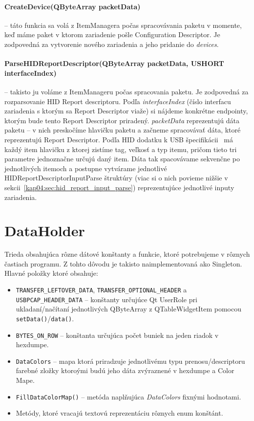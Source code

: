 \paragraph{CreateDevice(QByteArray packetData)} -- táto funkcia sa volá z ItemManagera počas spracovávania paketu v momente, keď máme paket v ktorom zariadenie pošle Configuration Descriptor. Je zodpovedná za vytvorenie nového zariadenia a jeho pridanie do \textit{devices}.

\paragraph{ParseHIDReportDescriptor(QByteArray packetData, USHORT interfaceIndex)} \label{kap04:sec:parse_hid} -- takisto ju voláme z ItemManageru počas spracovania paketu. Je zodpovedná za rozparsovanie HID Report descriptoru. Podľa \textit{interfaceIndex} (číslo interfacu zariadenia s ktorým sa Report Descriptor viaže) si nájdeme konkrétne endpointy, ktorým bude tento Report Descriptor priradený. \textit{packetData} reprezentujú dáta paketu -- v nich preskočíme hlavičku paketu a začneme spracovávať dáta, ktoré reprezentujú Report Descriptor. Podľa HID dodatku k USB špecifikácii~\cite{usbhid} má každý item hlavičku z ktorej zistíme tag, veľkosť a typ itemu, pričom tieto tri parametre jednoznačne určujú daný item. Dáta tak spacovávame sekvenčne po jednotlivých itemoch a postupne vytvárame jednotlivé HIDReportDescriptorInputParse štruktúry (viac si o nich povieme nižšie v sekcii~\ref{kap04:sec:hid_report_input_parse}) reprezentujúce jednotlivé inputy zariadenia.

\section{DataHolder}
\label{kap04:sec:data_holder}
Trieda obsahujúca rôzne dátové konštanty a funkcie, ktoré potrebujeme v rôznych častiach programu. Z tohto dôvodu je takisto naimplementovaná ako Singleton. Hlavné položky ktoré obsahuje:
\begin{itemize}
\item \texttt{TRANSFER\_LEFTOVER\_DATA}, \texttt{TRANSFER\_OPTIONAL\_HEADER} a \newline \texttt{USBPCAP\_HEADER\_DATA} -- konštanty určujúce Qt UserRole pri ukladaní/\newline načítaní jednotlivých QByteArray z QTableWidgetItem pomocou \newline \texttt{setData()}/\texttt{data()}.
\item \texttt{BYTES\_ON\_ROW} -- konštanta určujúca počet buniek na jeden riadok v hexdumpe.
\item \texttt{DataColors} -- mapa ktorá priradzuje jednotlivému typu prenosu/descripto\-ru farebné zložky ktoroými budú jeho dáta zvýraznené v hexdumpe a Color Mape.
\item \texttt{FillDataColorMap()} -- metóda naplňujúca \textit{DataColors} fixnými hodnotami.
\item Metódy, ktoré vracajú textovú reprezentáciu rôznych enum konštánt.
\end{itemize}

